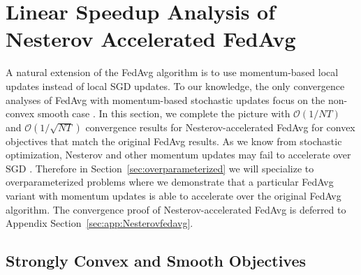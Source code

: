 


\section{Linear Speedup Analysis of Nesterov Accelerated FedAvg}
\label{sec:Nesterov}

A natural extension of the FedAvg algorithm is to use momentum-based
local updates instead of local SGD updates. To our knowledge, the
only convergence analyses of FedAvg with momentum-based stochastic
updates focus on the non-convex smooth case \cite{huo2020faster,yu2019linear,li2018federated}.
In this section, we complete the picture with $\mathcal{O}(1/NT)$
and $\mathcal{O}(1/\sqrt{NT})$ convergence results for Nesterov-accelerated
FedAvg for convex objectives that match the original FedAvg results.
As we know from stochastic optimization, Nesterov and other momentum
updates may fail to accelerate over SGD \cite{liu2018accelerating,kidambi2018insufficiency,liu2018toward,yuan2016influence}.
Therefore in Section~\ref{sec:overparameterized} we will specialize to overparameterized
problems where we demonstrate that a particular FedAvg variant with
momentum updates is able to accelerate over the original FedAvg algorithm. 
The convergence proof of Nesterov-accelerated FedAvg is deferred to Appendix Section~\ref{sec:app:Nesterovfedavg}.

\subsection{Strongly Convex and Smooth Objectives}

